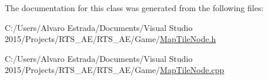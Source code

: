 The documentation for this class was generated from the following files\+:\begin{DoxyCompactItemize}
\item 
C\+:/\+Users/\+Alvaro Estrada/\+Documents/\+Visual Studio 2015/\+Projects/\+R\+T\+S\+\_\+\+A\+E/\+R\+T\+S\+\_\+\+A\+E/\+Game/\hyperlink{_map_tile_node_8h}{Map\+Tile\+Node.\+h}\item 
C\+:/\+Users/\+Alvaro Estrada/\+Documents/\+Visual Studio 2015/\+Projects/\+R\+T\+S\+\_\+\+A\+E/\+R\+T\+S\+\_\+\+A\+E/\+Game/\hyperlink{_map_tile_node_8cpp}{Map\+Tile\+Node.\+cpp}\end{DoxyCompactItemize}
